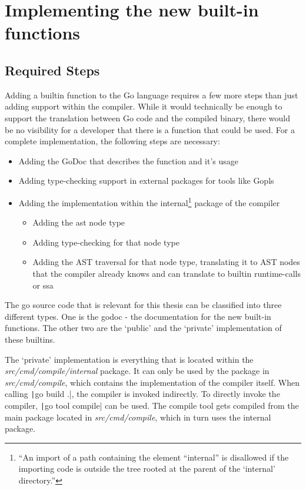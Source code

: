 \section{Implementing the new built-in functions}

\subsection{Required Steps}

Adding a builtin function to the Go language requires a few more steps than just
adding support within the compiler. While it would technically be enough to
support the translation between Go code and the compiled binary, there would be
no visibility for a developer that there is a function that could be used.
For a complete implementation, the following steps are necessary:
\begin{itemize}
    \item Adding the GoDoc\autocite{godoc} that describes the function and it's usage
    \item Adding type-checking support in external packages for tools like
    Gopls\autocite{gopls}
    \item Adding the implementation within the internal\footnote{
            ``An import of
            a path containing the element “internal” is disallowed if the
            importing code is outside the tree rooted at the parent of the
            `internal' directory.''\autocite{internal-packages}
        }
        package of the compiler
        \begin{itemize}
            \item Adding the \gls{ast} node type
            \item Adding type-checking for that node type
            \item Adding the AST traversal for that node type, translating it
                to AST nodes that the compiler already knows and can translate
                to builtin runtime-calls or \gls{ssa}
        \end{itemize}
\end{itemize}

The go source code that is relevant for this thesis can be classified into three different
types. One is the godoc - the documentation for the new built-in functions. The
other two are the `public' and the `private' implementation of these builtins.

The `private' implementation is everything that is located within the
\textit{src/cmd/compile/internal} package\autocite{internal-packages}. It can only
be used by the package in \textit{src/cmd/compile}, which contains the
implementation of the compiler itself. When calling \texttt|go build .|,
the compiler is invoked indirectly. To directly invoke the compiler,
\texttt|go tool compile| can be used. The compile tool gets compiled
from the main package located in \textit{src/cmd/compile}, which in turn
uses the internal package.

